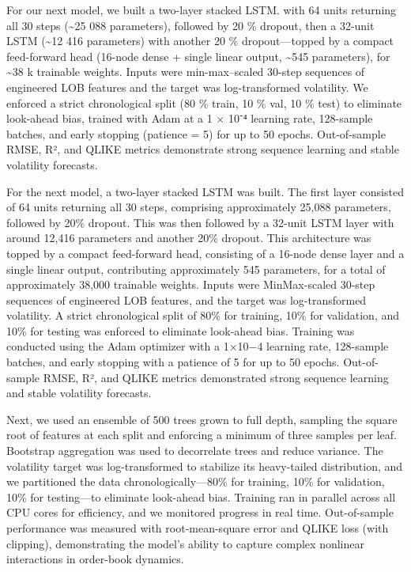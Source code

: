 \documentclass[
  letterpaper,
  DIV=11,
  numbers=noendperiod]{scrartcl}
\begin{document}
For our next model, we built a two-layer stacked LSTM. with 64 units
returning all 30 steps (\textasciitilde25 088 parameters), followed by
20 \% dropout, then a 32-unit LSTM (\textasciitilde12 416 parameters)
with another 20 \% dropout---topped by a compact feed-forward head
(16-node dense + single linear output, \textasciitilde545 parameters),
for \textasciitilde38 k trainable weights. Inputs were min-max--scaled
30-step sequences of engineered LOB features and the target was
log-transformed volatility. We enforced a strict chronological split (80
\% train, 10 \% val, 10 \% test) to eliminate look-ahead bias, trained
with Adam at a 1 × 10⁻⁴ learning rate, 128-sample batches, and early
stopping (patience = 5) for up to 50 epochs. Out-of-sample RMSE, R², and
QLIKE metrics demonstrate strong sequence learning and stable volatility
forecasts.

For the next model, a two-layer stacked LSTM was built. The first layer
consisted of 64 units returning all 30 steps, comprising approximately
25,088 parameters, followed by 20\% dropout. This was then followed by a
32-unit LSTM layer with around 12,416 parameters and another 20\%
dropout. This architecture was topped by a compact feed-forward head,
consisting of a 16-node dense layer and a single linear output,
contributing approximately 545 parameters, for a total of approximately
38,000 trainable weights. Inputs were MinMax-scaled 30-step sequences of
engineered LOB features, and the target was log-transformed volatility.
A strict chronological split of 80\% for training, 10\% for validation,
and 10\% for testing was enforced to eliminate look-ahead bias. Training
was conducted using the Adam optimizer with a 1×10−4 learning rate,
128-sample batches, and early stopping with a patience of 5 for up to 50
epochs. Out-of-sample RMSE, R², and QLIKE metrics demonstrated strong
sequence learning and stable volatility forecasts.

Next, we used an ensemble of 500 trees grown to full depth, sampling the
square root of features at each split and enforcing a minimum of three
samples per leaf. Bootstrap aggregation was used to decorrelate trees
and reduce variance. The volatility target was log-transformed to
stabilize its heavy-tailed distribution, and we partitioned the data
chronologically---80\% for training, 10\% for validation, 10\% for
testing---to eliminate look-ahead bias. Training ran in parallel across
all CPU cores for efficiency, and we monitored progress in real time.
Out-of-sample performance was measured with root-mean-square error and
QLIKE loss (with clipping), demonstrating the model's ability to capture
complex nonlinear interactions in order-book dynamics.
\end{document}
